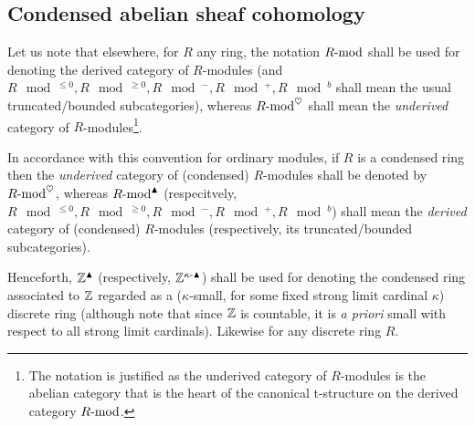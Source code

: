         \subsection{Condensed abelian sheaf cohomology}
            \begin{convention} \label{conv: derived_categories_of_condensed_modules}
                Let us note that elsewhere, for $R$ any ring, the notation $R\mod$ shall be used for denoting the derived category of $R$-modules (and $R\mod^{\leq 0}, R\mod^{\geq 0}, R\mod^-, R\mod^+, R\mod^b$ shall mean the usual truncated/bounded subcategories), whereas $R\mod^{\heart}$ shall mean the \textit{underived} category of $R$-modules\footnote{The notation is justified as the underived category of $R$-modules is the abelian category that is the heart of the canonical t-structure on the derived category $R\mod$.}. 
                
                In accordance with this convention for ordinary modules, if $R$ is a condensed ring then the \textit{underived} category of (condensed) $R$-modules shall be denoted by $R\mod^{\heart}$, whereas $R\mod^{\cond}$ (respecitvely, $R\mod^{\leq 0}, R\mod^{\geq 0}, R\mod^-, R\mod^+, R\mod^b$) shall mean the \textit{derived} category of (condensed) $R$-modules (respectively, its truncated/bounded subcategories).
            \end{convention}
            \begin{convention}
                Henceforth, $\Z^{\cond}$ (respectively, $\Z^{\kappa\-\cond}$) shall be used for denoting the condensed ring associated to $\Z$ regarded as a ($\kappa$-small, for some fixed strong limit cardinal $\kappa$) discrete ring (although note that since $\Z$ is countable, it is \textit{a priori} small with respect to all strong limit cardinals). Likewise for any discrete ring $R$.
            \end{convention}
            
